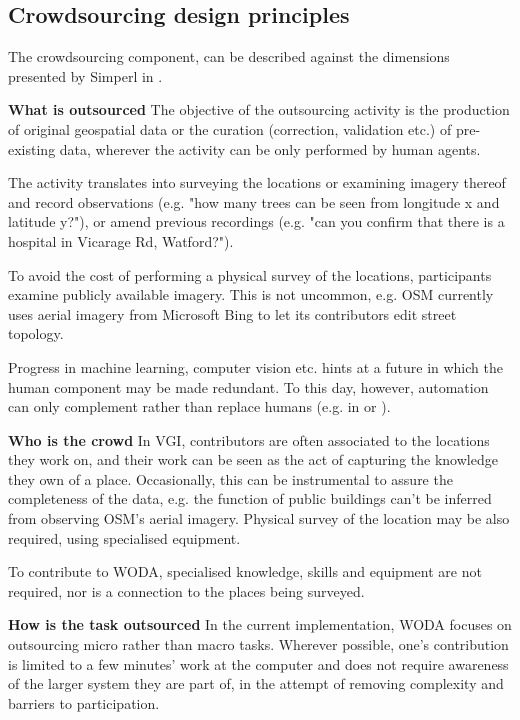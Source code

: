 \subsection{Crowdsourcing design principles}

The crowdsourcing component, can be described against the dimensions presented by Simperl in \cite{Simperl:2015ju}. 

\textbf{What is outsourced} The objective of the outsourcing activity is the production of original geospatial data or the curation (correction, validation etc.) of pre-existing data, wherever the activity can be only performed by human agents. 

The activity translates into surveying the locations or examining imagery thereof and record observations (e.g. "how many trees can be seen from longitude x and latitude y?"), or amend previous recordings (e.g. "can you confirm that there is a hospital in Vicarage Rd, Watford?"). 

To avoid the cost of performing a physical survey of the locations, participants examine publicly available imagery. This is not uncommon, e.g. OSM currently uses aerial imagery from Microsoft Bing to let its contributors edit street topology.

Progress in machine learning, computer vision etc. hints at a future in which the human component may be made redundant. To this day, however, automation can only complement rather than replace humans (e.g. in \cite{Goetz:1gd} or \cite{Schmid:2012we}).

\textbf{Who is the crowd} In VGI, contributors are often associated to the locations they work on, and their work can be seen as the act of capturing the knowledge they own of a place. Occasionally, this can be instrumental to assure the completeness of the data, e.g. the function of public buildings can't be inferred from observing OSM's aerial imagery. Physical survey of the location may be also required, using specialised equipment.

To contribute to WODA, specialised knowledge, skills and equipment are not required, nor is a connection to the places being surveyed. 

\textbf{How is the task outsourced} In the current implementation, WODA focuses on outsourcing micro rather than macro tasks. Wherever possible, one's contribution is limited to a few minutes' work at the computer and does not require awareness of the larger system they are part of, in the attempt of removing complexity and barriers to participation.

